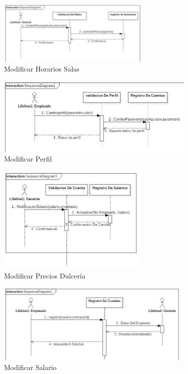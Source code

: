 \documentclass[12pt, fleqn]{report}                             %
\begin{document}
        \begin{figure}[ht]
            \centering
            \includegraphics[width=0.65\textwidth]{DiagramaSecuencial7}
            \caption{Modificar Horarios Salas}
        \end{figure}
        
        \begin{figure}[ht]
            \centering
            \includegraphics[width=0.85\textwidth]{DiagramaSecuencial8}
            \caption{Modificar Perfil}
        \end{figure}


        \begin{figure}[ht]
            \centering
            \includegraphics[width=0.65\textwidth]{DiagramaSecuencial9}
            \caption{Modificar Precios Dulcería}
        \end{figure}

        \begin{figure}[ht]
            \centering
            \includegraphics[width=0.85\textwidth]{DiagramaSecuencial10}
            \caption{Modificar Salario}
        \end{figure}
\end{document}
